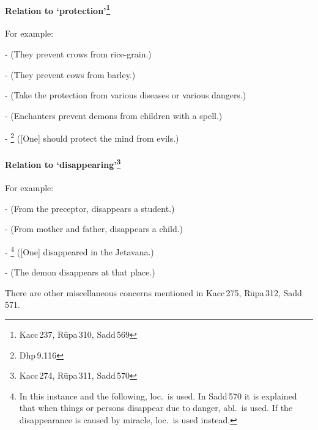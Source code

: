 \paragraph*{Relation to `protection'\footnote{Kacc\,237, R\=upa\,310, Sadd\,569}} For example:\par
-  (They prevent crows from rice-grain.)\par
-  (They prevent cows from barley.)\par
-  (Take the protection from various diseases or various dangers.)\par
-  (Enchanters prevent demons from children with a spell.)\par
- \footnote{Dhp\,9.116} ([One] should protect the mind from evils.)\par

\paragraph*{Relation to `disappearing'\footnote{Kacc\,274, R\=upa\,311, Sadd\,570}} For example:\par
-  (From the preceptor, disappears a student.)\par
-  (From mother and father, disappears a child.)\par
- \footnote{In this instance and the following, loc.\ is used. In Sadd\,570 it is explained that when things or persons disappear due to danger, abl.\ is used. If the disappearance is caused by miracle, loc.\ is used instead.} ([One] disappeared in the Jetavana.)\par
-  (The demon disappears at that place.)\par

\bigskip
There are other miscellaneous concerns mentioned in Kacc\,275, R\=upa\,312, Sadd\,571.
